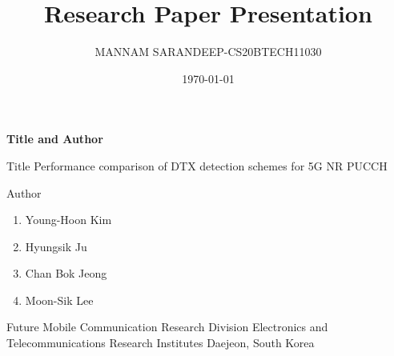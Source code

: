 \documentclass{beamer}
\title{Research Paper Presentation}
\author{MANNAM SARANDEEP-CS20BTECH11030}
\institute{INDIAN INSTITUTE OF TECHNOLOGY,HYDERABAD}
\date{\today}
\begin{document}
\begin{frame}
\titlepage
\end{frame}

\begin{frame}{\textbf{Title and Author}}
    \begin{block}{Title}
    Performance comparison of DTX detection schemes
    for 5G NR PUCCH
    \end{block}
    
    \begin{block}{Author}
    \begin{enumerate}
        \item Young-Hoon Kim
        \item Hyungsik Ju
        \item Chan Bok Jeong
        \item Moon-Sik Lee
    \end{enumerate}
    Future Mobile Communication Research Division
Electronics and Telecommunications Research Institutes
Daejeon, South Korea
    \end{block}
\end{frame}
\end{document}
